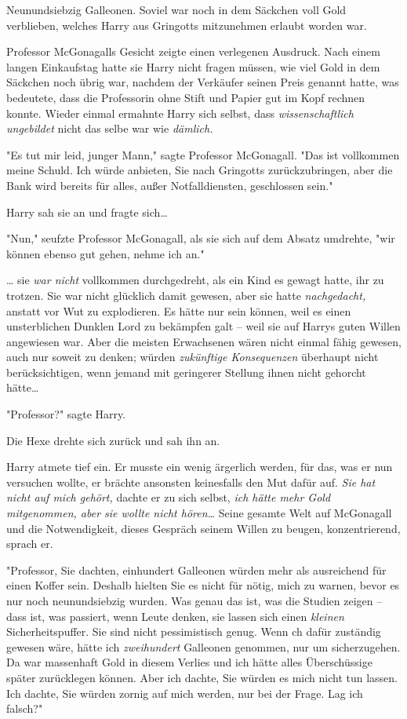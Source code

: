 {Neunundsiebzig Galleonen. Soviel war noch in dem Säckchen voll Gold verblieben, welches Harry aus Gringotts mitzunehmen erlaubt worden war.

Professor McGonagalls Gesicht zeigte einen verlegenen Ausdruck. Nach einem langen Einkaufstag hatte sie Harry nicht fragen müssen, wie viel Gold in dem Säckchen noch übrig war, nachdem der Verkäufer seinen Preis genannt hatte, was bedeutete, dass die Professorin ohne Stift und Papier gut im Kopf rechnen konnte. Wieder einmal ermahnte Harry sich selbst, dass \emph{wissenschaftlich ungebildet} nicht das selbe war wie \emph{dämlich.}

"Es tut mir leid, junger Mann," sagte Professor McGonagall. "Das ist vollkommen meine Schuld. Ich würde anbieten, Sie nach Gringotts zurückzubringen, aber die Bank wird bereits für alles, außer Notfalldiensten, geschlossen sein."

Harry sah sie an und fragte sich…

"Nun," seufzte Professor McGonagall, als sie sich auf dem Absatz umdrehte, "wir können ebenso gut gehen, nehme ich an."

… sie \emph{war nicht} vollkommen durchgedreht, als ein Kind es gewagt hatte, ihr zu trotzen. Sie war nicht glücklich damit gewesen, aber sie hatte \emph{nachgedacht,} anstatt vor Wut zu explodieren. Es hätte nur sein können, weil es einen unsterblichen Dunklen Lord zu bekämpfen galt -- weil sie auf Harrys guten Willen angewiesen war. Aber die meisten Erwachsenen wären nicht einmal fähig gewesen, auch nur soweit zu denken; würden \emph{zukünftige Konsequenzen} überhaupt nicht berücksichtigen, wenn jemand mit geringerer Stellung ihnen nicht gehorcht hätte…

"Professor?" sagte Harry.

Die Hexe drehte sich zurück und sah ihn an.

Harry atmete tief ein. Er musste ein wenig ärgerlich werden, für das, was er nun versuchen wollte, er brächte ansonsten keinesfalls den Mut dafür auf. \emph{Sie hat nicht auf mich gehört,} dachte er zu sich selbst, \emph{ich hätte mehr Gold mitgenommen, aber sie wollte nicht hören…} Seine gesamte Welt auf McGonagall und die Notwendigkeit, dieses Gespräch seinem Willen zu beugen, konzentrierend, sprach er.

"Professor, Sie dachten, einhundert Galleonen würden mehr als ausreichend für einen Koffer sein. Deshalb hielten Sie es nicht für nötig, mich zu warnen, bevor es nur noch neunundsiebzig wurden. Was genau das ist, was die Studien zeigen -- dass ist, was passiert, wenn Leute denken, sie lassen sich einen \emph{kleinen} Sicherheitspuffer. Sie sind nicht pessimistisch genug. Wenn ch dafür zuständig gewesen wäre, hätte ich \emph{zweihundert} Galleonen genommen, nur um sicherzugehen. Da war massenhaft Gold in diesem Verlies und ich hätte alles Überschüssige später zurücklegen können. Aber ich dachte, Sie würden es mich nicht tun lassen. Ich dachte, Sie würden zornig auf mich werden, nur bei der Frage. Lag ich falsch?"

}
